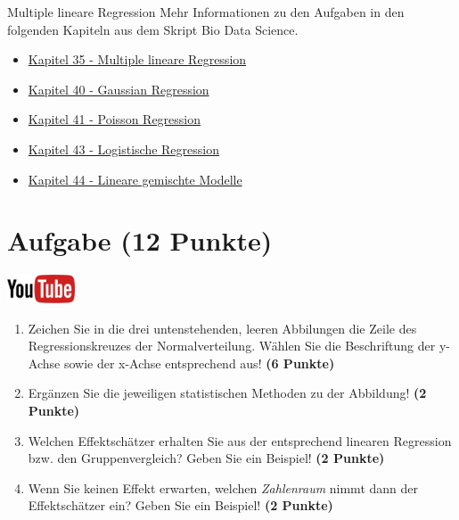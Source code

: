 \documentclass[a4paper, 10pt]{scrartcl}\usepackage[]{graphicx}\usepackage[]{xcolor}
\begin{document}
\clearpage
\begin{graybox}{Multiple lineare Regression}
Mehr Informationen zu den Aufgaben in den folgenden Kapiteln aus dem Skript Bio Data Science.
  \begin{itemize}
  \item \href{https://jkruppa.github.io/stat-modeling-basic.html}{Kapitel 35 - Multiple lineare Regression}
  \item \href{https://jkruppa.github.io/stat-modeling-gaussian.html}{Kapitel 40 - Gaussian Regression}
  \item \href{https://jkruppa.github.io/stat-modeling-poisson.html}{Kapitel 41 - Poisson Regression}
  \item \href{https://jkruppa.github.io/stat-modeling-logistic.html}{Kapitel 43 - Logistische Regression}
  \item \href{https://jkruppa.github.io/stat-modeling-mixed.html}{Kapitel 44 - Lineare gemischte Modelle}
  \end{itemize}
\end{graybox}
\clearpage

\section{Aufgabe \hfill (12 Punkte)}

\hfill\href{https://youtu.be/lHzRgm7hPw0}{\includegraphics[width =
  2cm]{img/youtube}}\\[1Ex]



\begin{enumerate}
\item Zeichen Sie in die drei untenstehenden, leeren Abbilungen die Zeile des
  Regressionskreuzes der Normalverteilung. W{\"a}hlen Sie die Beschriftung der
  y-Achse sowie der x-Achse entsprechend aus! \textbf{(6 Punkte)}
\item Erg{\"a}nzen Sie die jeweiligen statistischen Methoden zu der Abbildung! \textbf{(2 Punkte)}
\item Welchen Effektsch{\"a}tzer erhalten Sie aus der entsprechend linearen
  Regression bzw. den Gruppenvergleich? Geben Sie ein Beispiel! \textbf{(2 Punkte)}
\item Wenn Sie keinen Effekt erwarten, welchen \textit{Zahlenraum} nimmt dann
  der Effektsch{\"a}tzer ein? Geben Sie ein Beispiel! \textbf{(2 Punkte)}
\end{enumerate}
\end{document}
